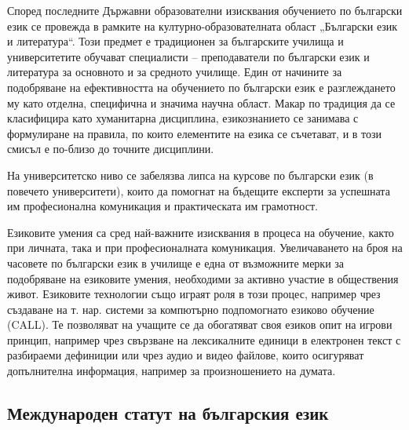 \begin{multicols}{2}
  Според последните Държавни образователни изисквания обучението по български език се провежда в рамките на културно-образователната област „Български
   език и литература“. Този предмет е традиционен за
   българските училища и университетите обучават
   специалисти – преподаватели по български език и литература за
   основното и за средното училище. Един от начините за
   подобряване на ефективността на обучението по български
   език е разглеждането му като отделна, специфична и значима научна област. Макар по традиция да се
   класифицира
   като
   хуманитарна
   дисциплина,
   езикознанието се занимава с формулиране на правила,
   по които елементите на езика се съчетават, и в този
   смисъл е по-близо до точните дисциплини.

  На университетско ниво се забелязва липса на курсове по
   български език (в повечето университети), които да помогнат на
   бъдещите експерти за успешната им професионална
   комуникация и практическата им грамотност.


  Езиковите умения са сред най-важните изисквания в процеса на обучение, както при личната, така и при професионалната комуникация. Увеличаването на броя
   на часовете по български език в училище е една от
   възможните мерки за подобряване на езиковите умения, необходими за активно участие в
   обществения живот. Езиковите технологии също играят роля в
   този процес, например чрез създаване на т. нар. системи
   за компютърно подпомогнато езиково обучение (CALL).
   Те позволяват на учащите се да обогатяват своя езиков
   опит на игрови принцип, например чрез свързване на
   лексикалните единици в електронен текст с разбираеми
   дефиниции или
   чрез аудио и видео файлове, които
   осигуряват допълнителна информация, например за произношението на думата. 

  \subsection{Международен статут на българския език}


\end{multicols}

